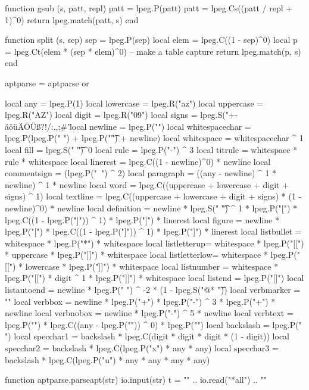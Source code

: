 \startluacode

function gsub (s, patt, repl)
  patt = lpeg.P(patt)
  patt = lpeg.Cs((patt / repl + 1)^0)
  return lpeg.match(patt, s)
end

function split (s, sep)
  sep = lpeg.P(sep)
  local elem = lpeg.C((1 - sep)^0)
  local p = lpeg.Ct(elem * (sep * elem)^0)   -- make a table capture
  return lpeg.match(p, s)
end

aptparse = aptparse or {}

local any         = lpeg.P(1)
local lowercase   = lpeg.R("az")
local uppercase   = lpeg.R("AZ")
local digit       = lpeg.R("09")
local signs       = lpeg.S("+-äöüÄÖÜß?!/:.,;#'\"%
local newline     = lpeg.P("\n")
local whitespacechar = lpeg.P(lpeg.P(" ") + lpeg.P("\t") + newline)
local whitespace  = whitespacechar ^ 1
local fill        = lpeg.S(" \t")^0
local rule        = lpeg.P("-") ^ 3
local titrule     = whitespace * rule * whitespace
local linerest    = lpeg.C((1 - newline)^0) * newline
local commentsign = (lpeg.P("~") ^ 2)
local paragraph   = ((any - newline) ^ 1 * newline) ^ 1 * newline
local word        = lpeg.C((uppercase + lowercase + digit + signs) ^ 1)
local textline    = lpeg.C((uppercase + lowercase + digit + signs) * (1 - newline)^0) * newline
local definition  = newline * lpeg.S(" \t") ^ 1 * lpeg.P("[") * lpeg.C((1 - lpeg.P("]")) ^ 1) * lpeg.P("]") * linerest
local figure      = newline * lpeg.P("[") * lpeg.C((1 - lpeg.P("]")) ^ 1) * lpeg.P("]") * linerest
local listbullet  = whitespace * lpeg.P("*") * whitespace
local listletterup= whitespace * lpeg.P("[[") * uppercase * lpeg.P("]]") * whitespace
local listletterlow= whitespace * lpeg.P("[[") * lowercase * lpeg.P("]]") * whitespace
local listnumber  = whitespace * lpeg.P("[[") * digit ^ 1 * lpeg.P("]]") * whitespace
local listend     = lpeg.P("[]")
local listautoend = newline * lpeg.P(" ") ^ -2 * (1 - lpeg.S("@* \n\t"))
local verbmarker  = "\n"
local verbbox     = newline * lpeg.P("+") * lpeg.P("-") ^ 3 * lpeg.P("+") * newline
local verbnobox   = newline * lpeg.P("-") ^ 5 * newline
local verbtext    = lpeg.P("\0") * lpeg.C((any - lpeg.P("\0")) ^ 0) * lpeg.P("\0")
local backslash   = lpeg.P("\\")
local specchar1   = backslash * lpeg.C(digit * digit * digit * (1 - digit))
local specchar2   = backslash * lpeg.C(lpeg.P("x") * any * any)
local specchar3   = backslash * lpeg.C(lpeg.P("u") * any * any * any * any)

function aptparse.parseapt(str)
    io.input(str)
    t = "\n" .. io.read("*all") .. "\n"
    
